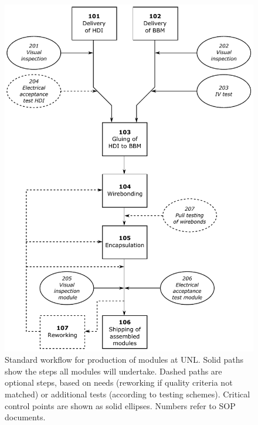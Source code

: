 \documentclass[12pt]{unlsilabsop}
\begin{document}
\begin{figure}[h]
    \begin{center}
        \includegraphics[width=12.7cm]{img/WorkflowProduction.pdf}
        \caption{Standard workflow for production of modules at UNL. Solid paths show the steps all modules will undertake. Dashed paths are optional steps, based on needs (reworking if quality criteria not matched) or additional tests (according to testing schemes). Critical control points are shown as solid ellipses. Numbers refer to SOP documents.}
        \label{fig:WorkflowProduction}
    \end{center}
\end{figure}

\end{document}
